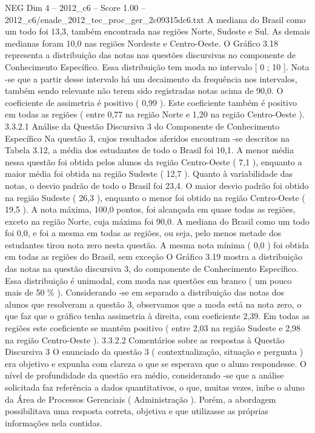 \begin{textsample}{NEG Dim 4 – 2012\_c6 – Score 1.00 – 2012\_c6/enade\_2012\_tec\_proc\_ger\_2c09315dc6.txt}
A mediana do Brasil como um todo foi 13,3, também encontrada nas regiões Norte, Sudeste e Sul.
As demais medianas foram 10,0 nas regiões Nordeste e Centro-Oeste.
O Gráfico 3.18 representa a distribuição das notas nas questões discursivas no componente de Conhecimento Específico.
Essa distribuição tem moda no intervalo [ 0 ; 10 ].
Nota -se que a partir desse intervalo há um decaimento da frequência nos intervalos, também sendo relevante não terem sido registradas notas acima de 90,0.
O coeficiente de assimetria é positivo ( 0,99 ).
Este coeficiente também é positivo em todas as regiões ( entre 0,77 na região Norte e 1,20 na região Centro-Oeste ). 3.3.2.1 Análise da Questão Discursiva 3 do Componente de Conhecimento Específico Na questão 3, cujos resultados aferidos encontram -se descritos na Tabela 3.12, a média dos estudantes de todo o Brasil foi 10,1.
A menor média nessa questão foi obtida pelos alunos da região Centro-Oeste ( 7,1 ), enquanto a maior média foi obtida na região Sudeste ( 12,7 ).
Quanto à variabilidade das notas, o desvio padrão de todo o Brasil foi 23,4.
O maior desvio padrão foi obtido na região Sudeste ( 26,3 ), enquanto o menor foi obtido na região Centro-Oeste ( 19,5 ).
A nota máxima, 100,0 pontos, foi alcançada em quase todas as regiões, exceto na região Norte, cuja máxima foi 90,0.
A mediana do Brasil como um todo foi 0,0, e foi a mesma em todas as regiões, ou seja, pelo menos metade dos estudantes tirou nota zero nesta questão.
A mesma nota mínima ( 0,0 ) foi obtida em todas as regiões do Brasil, sem exceção O Gráfico 3.19 mostra a distribuição das notas na questão discursiva 3, do componente de Conhecimento Específico.
Essa distribuição é unimodal, com moda nas questões em branco ( um pouco mais de 50 \% ).
Considerando -se em separado a distribuição das notas dos alunos que resolveram a questão 3, observamos que a moda está na nota zero, o que faz que o gráfico tenha assimetria à direita, com coeficiente 2,39.
Em todas as regiões este coeficiente se mantém positivo ( entre 2,03 na região Sudeste e 2,98 na região Centro-Oeste ). 3.3.2.2 Comentários sobre as respostas à Questão Discursiva 3 O enunciado da questão 3 ( contextualização, situação e pergunta ) era objetivo e expunha com clareza o que se esperava que o aluno respondesse.
O nível de profundidade da questão era médio, considerando -se que a análise solicitada faz referência a dados quantitativos, o que, muitas vezes, inibe o aluno da Área de Processos Gerenciais ( Administração ).
Porém, a abordagem possibilitava uma resposta correta, objetiva e que utilizasse as próprias informações nela contidas.

\end{textsample}
